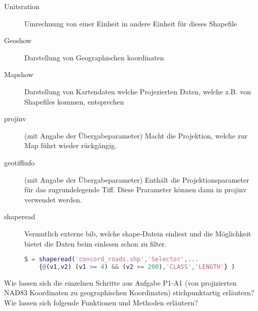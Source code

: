 \begin{description}
	\item[Unitsration] Umrechnung von einer Einheit in andere Einheit für dieses Shapefile
	\item[Geoshow] Darstellung von Geographischen koordinaten
	\item[Mapshow] Darstellung von Kartendaten welche Projezierten Daten, welche z.B. von Shapefiles kommen, entsprechen
	\item[projinv] (mit Angabe der Übergabeparameter) Macht die Projektion, welche zur Map führt wieder rückgängig.
	\item[geotiffinfo] (mit Angabe der Übergabeparameter) Enthält die Projektionsparameter für das zugrundelegende Tiff. Diese Prarameter können dann in projinv verwendet werden.
	\item[shaperead] Vermutlich externe bib, welche shape-Datein einliest und die Möglichkeit bietet die Daten beim einlesen schon zu filter.
	\begin{lstlisting}[caption=shaperead.m, language=matlab, label=shaperead]
	S = shaperead('concord_roads.shp','Selector',... 
	{@(v1,v2) (v1 >= 4) && (v2 >= 200),'CLASS','LENGTH'} )
	\end{lstlisting}
	
\end{description}

Wie lassen sich die einzelnen Schritte aus Aufgabe P1-A1 (von projizierten NAD83 Koordinaten zu geographischen Koordinaten) stichpunktartig erläutern?
Wie lassen sich folgende Funktionen und Methoden erläutern?





